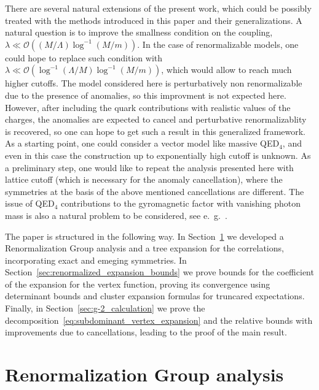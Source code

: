\documentclass[a4paper, 11pt]{article}
\newcommand{\BigO}{\mathcal{O}}								%
\theoremstyle{thm}
\begin{document}
There are several natural extensions of the present work, which could be possibly treated with the methods introduced in this paper and their generalizations. 
A natural question is to improve the smallness condition on the coupling,
$\lambda \ll \BigO( (M/\Lambda)\log^{-1}(M/m))$.
In the case of renormalizable models, one could hope to replace such condition with $\lambda \ll \BigO(\log^{-1}(\Lambda/M)\log^{-1}(M/m))$, which would allow to reach much higher cutoffs. The model considered here is perturbatively non renormalizable due to the presence of anomalies, so this improvment is not expected here. However, after including the quark contributions with realistic values of the charges, the anomalies are expected to cancel and perturbative renormalizablity is recovered, so one can hope to get such a result in this generalized framework.
As a starting point, one could consider a vector model like massive QED$_4$, and even in this case the construction up to exponentially high cutoff is unknown.
As a preliminary step, one would like to repeat the analysis presented here with lattice cutoff (which is necessary for the anomaly cancellation), where the symmetries at the basis of the above mentioned cancellations are different.
The issue of QED$_4$ contributions to the gyromagnetic factor with vanishing photon mass is also a natural problem to be considered, see e.\ g.~\cite{Kaplan_2021}.

The paper is structured in the following way. In Section~\ref{sec:RG_analysis} we developed a Renormalization Group analysis and a tree expansion for the correlations, incorporating exact and emeging symmetries. In Section~\ref{sec:renormalized_expansion_bounds} we prove bounds for the coefficient of the expansion for the vertex function, proving its convergence using determinant bounds and cluster expansion formulas for truncared expectations. Finally, in Section~\ref{sec:g-2_calculation} we prove the decomposition~\eqref{eq:subdominant_vertex_expansion} and the relative bounds with improvements due to cancellations, leading to the proof of the main result.

\section{Renormalization Group analysis}
\label{sec:RG_analysis}
\end{document}
